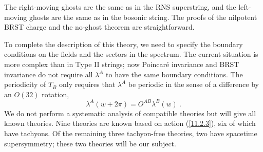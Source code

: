 The right-moving ghosts are the same as in the RNS superstring, and the left-moving ghosts are the same as in the bosonic string. The proofs of the nilpotent BRST charge and the no-ghost theorem are straightforward.

To complete the description of this theory, we need to specify the boundary conditions on the fields and the sectors in the spectrum. The current situation is more complex than in Type II strings; now Poincaré invariance and BRST invariance do not require all $\lambda^{A}$ to have the same boundary conditions. The periodicity of $T_{B}$ only requires that $\lambda^{A}$ be periodic in the sense of a difference by an $O(32)$ rotation,
\begin{equation}
	\lambda^{A}(w+2\pi) = O^{AB}\lambda^{B}(w) \:. \label{11.2.6} 
\end{equation}
We do not perform a systematic analysis of compatible theories but will give all known theories. Nine theories are known based on action (\ref{11.2.3}), six of which have tachyons. Of the remaining three tachyon-free theories, two have spacetime supersymmetry; these two theories will be our subject.

